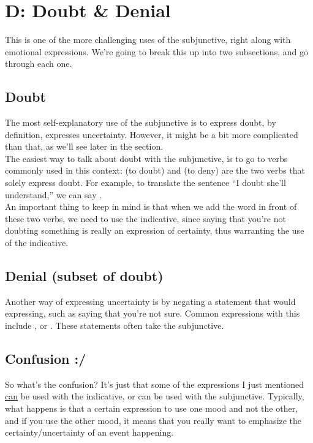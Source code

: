 \section{D: Doubt \& Denial}

This is one of the more challenging uses of the subjunctive, right along with emotional expressions. We're going to break this up into two subsections, and go through each one. 

\subsection{Doubt}

The most self-explanatory use of the subjunctive is to express doubt, by definition, expresses uncertainty. However, it might be a bit more complicated than that, as we'll see later in the section. \\

The easiest way to talk about doubt with the subjunctive, is to go to verbs commonly used in this context:  (to doubt) and  (to deny) are the two verbs that solely express doubt. For example, to translate the sentence ``I doubt she'll understand,'' we can say . \\

An important thing to keep in mind is that when we add the word  in front of these two verbs, we need to use the indicative, since saying that you're not doubting something is really an expression of certainty, thus warranting the use of the indicative.
\subsection{Denial (subset of doubt)}

Another way of expressing uncertainty is by negating a statement that would expressing, such as saying that you're not sure. Common expressions with this include ,  or . These statements often take the subjunctive. 

\subsection{Confusion :/}

So what's the confusion? It's just that some of the expressions I just mentioned \underline{can} be used with the indicative, or can be used with the subjunctive. Typically, what happens is that a certain expression  to use one mood and not the other, and if you use the other mood, it means that you really want to emphasize the certainty/uncertainty of an event happening. \\

